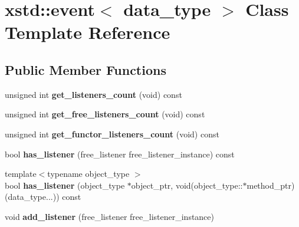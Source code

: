 \hypertarget{classxstd_1_1event}{\section{xstd\-:\-:event$<$ data\-\_\-type $>$ Class Template Reference}
\label{classxstd_1_1event}
}
\subsection*{Public Member Functions}
\begin{DoxyCompactItemize}
\item 
\hypertarget{classxstd_1_1event_af5ce6caa7da361833c3098686a28eb4a}{unsigned int {\bfseries get\-\_\-listeners\-\_\-count} (void) const }\label{classxstd_1_1event_af5ce6caa7da361833c3098686a28eb4a}

\item 
\hypertarget{classxstd_1_1event_a91e77f734b2fe690615a9684446594a9}{unsigned int {\bfseries get\-\_\-free\-\_\-listeners\-\_\-count} (void) const }\label{classxstd_1_1event_a91e77f734b2fe690615a9684446594a9}

\item 
\hypertarget{classxstd_1_1event_a6aec13f27635f3ad58435337f6063659}{unsigned int {\bfseries get\-\_\-functor\-\_\-listeners\-\_\-count} (void) const }\label{classxstd_1_1event_a6aec13f27635f3ad58435337f6063659}

\item 
\hypertarget{classxstd_1_1event_a28d29a9104d4e8c3986376b2ffca0a48}{bool {\bfseries has\-\_\-listener} (free\-\_\-listener free\-\_\-listener\-\_\-instance) const }\label{classxstd_1_1event_a28d29a9104d4e8c3986376b2ffca0a48}

\item 
\hypertarget{classxstd_1_1event_acbfdc5b60687237a2b42bc6e7d00d4a4}{{\footnotesize template$<$typename object\-\_\-type $>$ }\\bool {\bfseries has\-\_\-listener} (object\-\_\-type $\ast$object\-\_\-ptr, void(object\-\_\-type\-::$\ast$method\-\_\-ptr)(data\-\_\-type...)) const }\label{classxstd_1_1event_acbfdc5b60687237a2b42bc6e7d00d4a4}

\item 
\hypertarget{classxstd_1_1event_a6d7320f608d4f7b072b62a5e66ea8d62}{void {\bfseries add\-\_\-listener} (free\-\_\-listener free\-\_\-listener\-\_\-instance)}\label{classxstd_1_1event_a6d7320f608d4f7b072b62a5e66ea8d62}


\end{DoxyCompactItemize}
